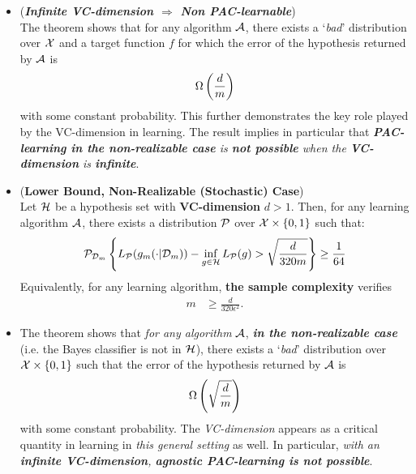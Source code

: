 \documentclass[11pt]{article}
\begin{document}
\begin{itemize}
\item \begin{remark} (\emph{\textbf{Infinite VC-dimension $\Rightarrow$ Non PAC-learnable}})\\
The theorem shows that for any algorithm ${\mathcal A}$, there exists a `\emph{bad}' distribution over ${\mathcal X}$ and a target function $f$ for which the error of the hypothesis returned by ${\mathcal A}$ is
\begin{align*}
\Omega\left(\frac{d}{m}\right)
\end{align*} with some constant probability. This further demonstrates the key role played by the VC-dimension in learning. The result implies in particular that \emph{\textbf{PAC-learning in the non-realizable case} is \textbf{not possible} when the \textbf{VC-dimension} is \textbf{infinite}}.
\end{remark}

\item \begin{proposition} (\textbf{Lower Bound, Non-Realizable (Stochastic) Case}) \citep{mohri2018foundations} \\
Let ${\mathcal H}$ be a hypothesis set with \textbf{VC-dimension} $d > 1$. Then, for any learning algorithm ${\mathcal A}$, there exists a distribution ${\mathcal P}$ over ${\mathcal X} \times \left\{0, 1\right\}$ such that:
\begin{align*}
{\mathcal P}_{{\mathcal D}_m}\left\{L_{{\mathcal P}}(g_{m}(\cdot| {\mathcal D}_m)) - \inf_{g \in {\mathcal H}}L_{{\mathcal P}}(g)  > \sqrt{\frac{d}{320 m}}\right\} \ge \frac{1}{64}
\end{align*} Equivalently, for any learning algorithm, \textbf{the sample complexity} verifies
\begin{align*}
m &\ge \frac{d}{320 \epsilon^2}.
\end{align*}
\end{proposition}

\item \begin{remark}
The theorem shows that \emph{for any algorithm} ${\mathcal A}$, \emph{\textbf{in the non-realizable case}} (i.e. the Bayes classifier is not in ${\mathcal H}$), there exists
a `\emph{bad}' distribution over ${\mathcal X} \times \left\{0, 1\right\}$ such that the error of the hypothesis returned by ${\mathcal A}$ is
\begin{align*}
\Omega\left(\sqrt{\frac{d}{m}}\right)
\end{align*} with some constant probability. The \emph{VC-dimension} appears as a critical quantity in learning in \emph{this general setting} as well. In particular, \emph{with an \textbf{infinite VC-dimension}, \textbf{agnostic PAC-learning is not possible}}.
\end{remark}
\end{itemize}


\newpage


\end{document}
